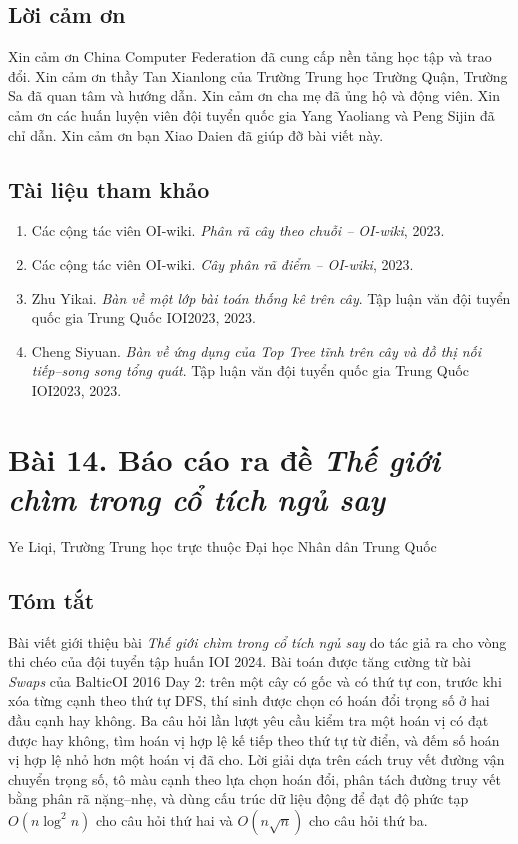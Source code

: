 \documentclass[11pt]{article}
\begin{document}
\subsection*{Lời cảm ơn}

Xin cảm ơn China Computer Federation đã cung cấp nền tảng học tập và trao đổi.
Xin cảm ơn thầy Tan Xianlong của Trường Trung học Trường Quận, Trường Sa đã
quan tâm và hướng dẫn. Xin cảm ơn cha mẹ đã ủng hộ và động viên. Xin cảm ơn
các huấn luyện viên đội tuyển quốc gia Yang Yaoliang và Peng Sijin đã chỉ
dẫn. Xin cảm ơn bạn Xiao Daien đã giúp đỡ bài viết này.

\subsection*{Tài liệu tham khảo}

\begin{enumerate}
  \item Các cộng tác viên OI-wiki. \emph{Phân rã cây theo chuỗi -- OI-wiki},
  2023.
  \item Các cộng tác viên OI-wiki. \emph{Cây phân rã điểm -- OI-wiki}, 2023.
  \item Zhu Yikai. \emph{Bàn về một lớp bài toán thống kê trên cây}. Tập luận
  văn đội tuyển quốc gia Trung Quốc IOI2023, 2023.
  \item Cheng Siyuan. \emph{Bàn về ứng dụng của Top Tree tĩnh trên cây và đồ
  thị nối tiếp--song song tổng quát}. Tập luận văn đội tuyển quốc gia Trung
  Quốc IOI2023, 2023.
\end{enumerate}

\section*{Bài 14. Báo cáo ra đề \emph{Thế giới chìm trong cổ tích ngủ say}}

\begin{center}
Ye Liqi, Trường Trung học trực thuộc Đại học Nhân dân Trung Quốc
\end{center}

\subsection*{Tóm tắt}

Bài viết giới thiệu bài \emph{Thế giới chìm trong cổ tích ngủ say} do tác giả
ra cho vòng thi chéo của đội tuyển tập huấn IOI 2024. Bài toán được tăng cường
từ bài \emph{Swaps} của BalticOI 2016 Day 2: trên một cây có gốc và có thứ tự
con, trước khi xóa từng cạnh theo thứ tự DFS, thí sinh được chọn có hoán đổi
trọng số ở hai đầu cạnh hay không. Ba câu hỏi lần lượt yêu cầu kiểm tra một
hoán vị có đạt được hay không, tìm hoán vị hợp lệ kế tiếp theo thứ tự từ điển,
và đếm số hoán vị hợp lệ nhỏ hơn một hoán vị đã cho. Lời giải dựa trên cách
truy vết đường vận chuyển trọng số, tô màu cạnh theo lựa chọn hoán đổi, phân
tách đường truy vết bằng phân rã nặng--nhẹ, và dùng cấu trúc dữ liệu động để
đạt độ phức tạp \(O(n\log^2 n)\) cho câu hỏi thứ hai và \(O(n\sqrt n)\) cho
câu hỏi thứ ba.
\end{document}

